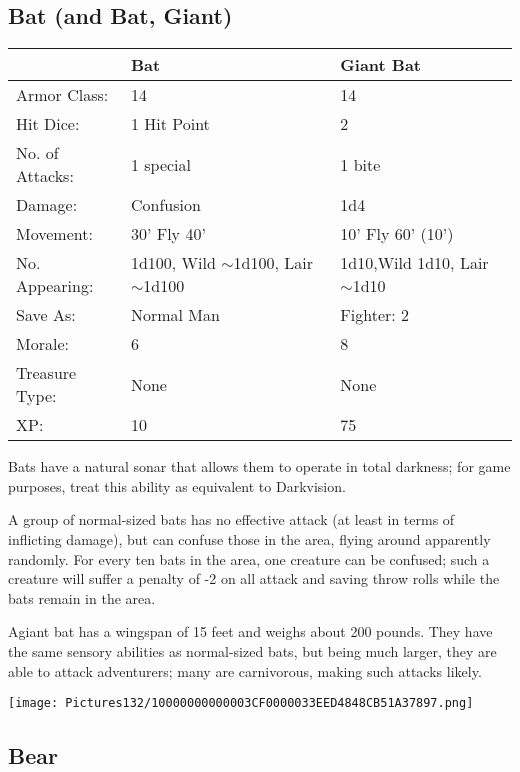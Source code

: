 \documentclass[a4paper,twoside,openany,10pt]{book}
\begin{document}
\begin{multicols}{2}
\subsection*{Bat (and Bat, Giant)}\label{bat-and-bat-giant}


\begin{flushleft}
	\begin{tabularx}{0.48\textwidth}{lXX}
& Bat & Giant Bat \\\hline
Armor Class: & 14 & 14 \\\hline
Hit Dice: & 1 Hit Point & 2 \\\hline
No. of Attacks: & 1 special & 1 bite \\\hline
Damage: & Confusion & 1d4 \\\hline
Movement: & 30' Fly 40' &10' Fly 60' (10') \\\hline
No. Appearing: & 1d100, Wild $\sim$1d100, Lair $\sim$1d100 & 1d10,Wild 1d10, Lair $\sim$1d10 \\\hline
Save As: & Normal Man & Fighter: 2 \\\hline
Morale: & 6 & 8 \\\hline
Treasure Type: & None & None \\\hline
XP: & 10 & 75 \\\hline
\end{tabularx}\medskip
\end{flushleft}

Bats have a natural sonar that allows them to operate in total darkness; for game purposes, treat this ability as equivalent to Darkvision.

A group of normal-sized bats has no effective attack (at least in terms of inflicting damage), but can confuse those in the area, flying around apparently randomly. For every ten bats in the area, one creature can be confused; such a creature will suffer a penalty of -2 on all attack and saving throw rolls while the bats remain in the area.

Agiant bat has a wingspan of 15 feet and weighs about 200 pounds. They have the same sensory abilities as normal-sized bats, but being much larger, they are able to attack adventurers; many are carnivorous, making such attacks likely.

\begin{center}
	\texttt{[image: Pictures132/10000000000003CF0000033EED4848CB51A37897.png]}
\end{center}


\subsection*{Bear}\label{bear}


\end{multicols}
\end{document}

